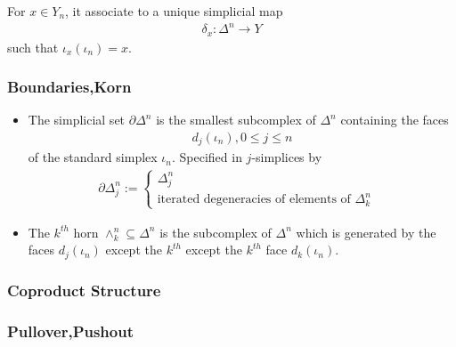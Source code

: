 \documentclass[Total.tex]{subfiles}
\begin{document}
				For $x\in Y_n$, it associate to a unique simplicial map
				\begin{gather*}
					\delta_x:\Delta^n\rightarrow Y
				\end{gather*}
				such that $\iota_x(\iota_n)=x$.
				\subsubsection{Boundaries,Korn}
				\begin{Def}
					\begin{itemize}
						\item The simplicial set $\partial \Delta^n$ is the smallest subcomplex of $\Delta^n$ containing the faces
						\begin{gather*}
							d_j(\iota_n),0\leq j\leq n
						\end{gather*}
						of the standard simplex $\iota_n$. Specified in $j$-simplices by
						\begin{gather*}
							\partial \Delta_j^n:=\begin{cases}
								\Delta^n_j&\\
								\mbox{iterated degeneracies of elements of }\Delta^n_k
							\end{cases}
						\end{gather*}
						\item The $k^{th}$ horn $\wedge^n_k\subseteq \Delta^n$ is the subcomplex of $\Delta^n$ which is generated by the faces $d_j(\iota_n)$ except the $k^{th}$ except the $k^{th}$ face $d_k(\iota_n)$.
					\end{itemize}
				\end{Def}
				\subsubsection{Coproduct Structure}
				\subsubsection{Pullover,Pushout}
\end{document}
